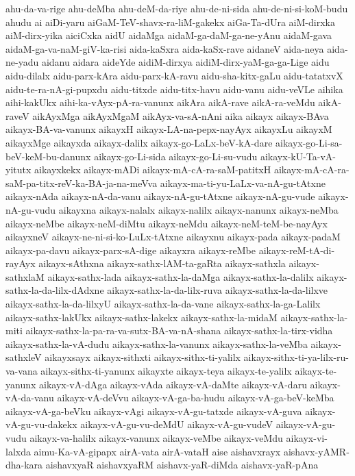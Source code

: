 {ahu-da-va-rige
ahu-deMba
ahu-deM-da-riye
ahu-de-ni-sida
ahu-de-ni-si-koM-budu
ahudu
ai
aiDi-yaru
aiGaM-TeV-shavx-ra-liM-gakekx
aiGa-Ta-dUra
aiM-dirxka
aiM-dirx-yika
aiciCxka
aidU
aidaMga
aidaM-ga-daM-ga-ne-yAnu
aidaM-gava
aidaM-ga-va-naM-giV-ka-risi
aida-kaSxra
aida-kaSx-rave
aidaneV
aida-neya
aida-ne-yadu
aidanu
aidara
aideYde
aidiM-dirxya
aidiM-dirx-yaM-ga-ga-Lige
aidu
aidu-dilalx
aidu-parx-kAra
aidu-parx-kA-ravu
aidu-sha-kitx-gaLu
aidu-tatatxvX
aidu-te-ra-nA-gi-pupxdu
aidu-titxde
aidu-titx-havu
aidu-vanu
aidu-veVLe
aihika
aihi-kakUkx
aihi-ka-vAyx-pA-ra-vanunx
aikAra
aikA-rave
aikA-ra-veMdu
aikA-raveV
aikAyxMga
aikAyxMgaM
aikAyx-va-sA-nAni
aika
aikayx
aikayx-BAva
aikayx-BA-va-vanunx
aikayxH
aikayx-LA-na-pepx-nayAyx
aikayxLu
aikayxM
aikayxMge
aikayxda
aikayx-dalilx
aikayx-go-LaLx-beV-kA-dare
aikayx-go-Li-sa-beV-keM-bu-danunx
aikayx-go-Li-sida
aikayx-go-Li-su-vudu
aikayx-kU-Ta-vA-yitutx
aikayxkekx
aikayx-mADi
aikayx-mA-cA-ra-saM-patitxH
aikayx-mA-cA-ra-saM-pa-titx-reV-ka-BA-ja-na-meVva
aikayx-ma-ti-yu-LaLx-va-nA-gu-tAtxne
aikayx-nAda
aikayx-nA-da-vanu
aikayx-nA-gu-tAtxne
aikayx-nA-gu-vude
aikayx-nA-gu-vudu
aikayxna
aikayx-nalalx
aikayx-nalilx
aikayx-nanunx
aikayx-neMba
aikayx-neMbe
aikayx-neM-diMtu
aikayx-neMdu
aikayx-neM-teM-be-nayAyx
aikayxneV
aikayx-ne-ni-si-ko-LuLx-tAtxne
aikayxnu
aikayx-pada
aikayx-padaM
aikayx-pa-davu
aikayx-parx-sA-dige
aikayxra
aikayx-reMbe
aikayx-reM-tA-di-rayAyx
aikayx-sAthxna
aikayx-sathx-lAM-ta-gaRta
aikayx-sathxla
aikayx-sathxlaM
aikayx-sathx-lada
aikayx-sathx-la-daMga
aikayx-sathx-la-dalilx
aikayx-sathx-la-da-lilx-dAdxne
aikayx-sathx-la-da-lilx-ruva
aikayx-sathx-la-da-lilxve
aikayx-sathx-la-da-lilxyU
aikayx-sathx-la-da-vane
aikayx-sathx-la-ga-Lalilx
aikayx-sathx-lakUkx
aikayx-sathx-lakekx
aikayx-sathx-la-midaM
aikayx-sathx-la-miti
aikayx-sathx-la-pa-ra-va-sutx-BA-va-nA-shana
aikayx-sathx-la-tirx-vidha
aikayx-sathx-la-vA-dudu
aikayx-sathx-la-vanunx
aikayx-sathx-la-veMba
aikayx-sathxleV
aikayxsayx
aikayx-sithxti
aikayx-sithx-ti-yalilx
aikayx-sithx-ti-ya-lilx-ru-va-vana
aikayx-sithx-ti-yanunx
aikayxte
aikayx-teya
aikayx-te-yalilx
aikayx-te-yanunx
aikayx-vA-dAga
aikayx-vAda
aikayx-vA-daMte
aikayx-vA-daru
aikayx-vA-da-vanu
aikayx-vA-deVvu
aikayx-vA-ga-ba-hudu
aikayx-vA-ga-beV-keMba
aikayx-vA-ga-beVku
aikayx-vAgi
aikayx-vA-gu-tatxde
aikayx-vA-guva
aikayx-vA-gu-vu-dakekx
aikayx-vA-gu-vu-deMdU
aikayx-vA-gu-vudeV
aikayx-vA-gu-vudu
aikayx-va-halilx
aikayx-vanunx
aikayx-veMbe
aikayx-veMdu
aikayx-vi-lalxda
aimu-Ka-vA-gipapx
airA-vata
airA-vataH
aise
aishavxrayx
aishavx-yAMR-dha-kara
aishavxyaR
aishavxyaRM
aishavx-yaR-diMda
aishavx-yaR-pAna
}
